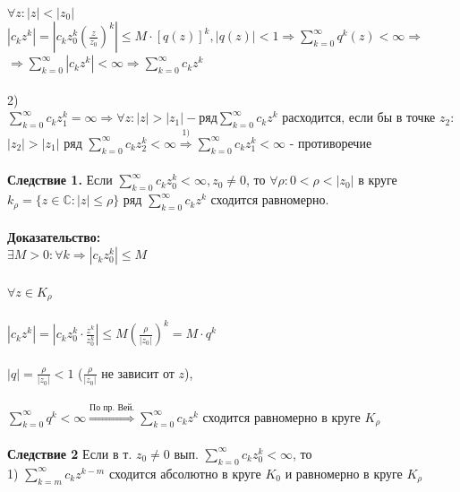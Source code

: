 \documentclass[a4paper,12pt]{article} %
\begin{document}
\ \\
$ \forall z: |z| < |z_0| $ \\
$ |c_k z^k| = | c_k z_0^k  \left(  \frac{z}{z_0} \right)^k | \leqslant M \cdot \left[ q(z) \right]^k, |q(z)| < 1 \Rightarrow \sum\limits_{k = 0}^\infty q^k(z) < \infty \Rightarrow
$\\
$
 \Rightarrow \sum\limits_{k = 0}^\infty |c_k z^k| < \infty \Rightarrow \sum\limits_{k = 0}^\infty c_k z^k
$\\
\ \\
2) $
\sum\limits_{k = 0}^\infty c_k z_1^k = \infty \Rightarrow \forall z: |z| > |z_1| - \text{ряд} \sum\limits_{k = 0}^\infty c_k z^k \text{ расходится, если бы в точке } z_2: 
$\\
$
|z_2| > |z_1| \text{ ряд } \sum\limits_{k = 0}^\infty c_k z_2^k < \infty \stackrel{1)}{\Rightarrow} \sum\limits_{k = 0}^\infty c_k z_1^k < \infty
$ - противоречие \\
\ \\
\noindent\textbf{Следствие 1. } Если $\sum\limits_{k = 0}^\infty c_k z_0^k < \infty, z_0 \neq 0$, то $\forall \rho: 0 < \rho < |z_0|$ в круге $k_{\rho} = \{z \in \mathbb{C} : |z| \leqslant \rho \} \text{ ряд } \sum\limits_{k = 0}^\infty c_k z^k$ сходится равномерно. \\
\ \\
\noindent\textbf{Доказательство:} \\
$
\exists M > 0: \forall k \Rightarrow |c_k z_0^k| \leqslant M
$ \\
\ \\
$ \forall z \in K_{\rho} $\\
\ \\
$
|c_k z^k| = |c_k z_0^k \cdot \frac{z^k}{z_0^k} | \leqslant M \left( \frac{\rho}{|z_0|} \right)^k = M \cdot q^k
$ \\
\ \\
$ |q| = \frac{\rho}{|z_0|} < 1 $ ($\frac{\rho}{|z_0|}$ не зависит от $z$), \\
\ \\
$\sum\limits_{k = 0}^\infty q^k < \infty \stackrel{\text{По пр. Вей.}}{\Rightarrow} \sum\limits_{k = 0}^\infty c_k z^k$ сходится равномерно в круге  $K_{\rho}$ \\
\ \\
\noindent\textbf{Следствие 2} Если в т. $z_0 \neq 0 $ вып. $\sum\limits_{k = 0}^\infty c_k z_0^k < \infty $, то \\
1) $\sum\limits_{k = m}^\infty c_k z^{k - m}$ сходится абсолютно в круге $K_0$ и равномерно в круге $K_{\rho}$ \\
\end{document}
